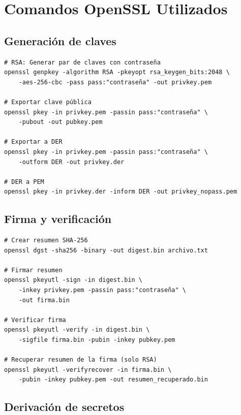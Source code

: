 \documentclass[12pt,a4paper]{report}
\begin{document}

\appendix

\chapter{Comandos OpenSSL Utilizados}

\section{Generación de claves}

\begin{lstlisting}[caption=Comandos para generación de claves]
# RSA: Generar par de claves con contraseña
openssl genpkey -algorithm RSA -pkeyopt rsa_keygen_bits:2048 \
    -aes-256-cbc -pass pass:"contraseña" -out privkey.pem

# Exportar clave pública
openssl pkey -in privkey.pem -passin pass:"contraseña" \
    -pubout -out pubkey.pem

# Exportar a DER
openssl pkey -in privkey.pem -passin pass:"contraseña" \
    -outform DER -out privkey.der

# DER a PEM
openssl pkey -in privkey.der -inform DER -out privkey_nopass.pem
\end{lstlisting}

\section{Firma y verificación}

\begin{lstlisting}[caption=Comandos para firma digital]
# Crear resumen SHA-256
openssl dgst -sha256 -binary -out digest.bin archivo.txt

# Firmar resumen
openssl pkeyutl -sign -in digest.bin \
    -inkey privkey.pem -passin pass:"contraseña" \
    -out firma.bin

# Verificar firma
openssl pkeyutl -verify -in digest.bin \
    -sigfile firma.bin -pubin -inkey pubkey.pem

# Recuperar resumen de la firma (solo RSA)
openssl pkeyutl -verifyrecover -in firma.bin \
    -pubin -inkey pubkey.pem -out resumen_recuperado.bin
\end{lstlisting}

\section{Derivación de secretos}
\end{document}
